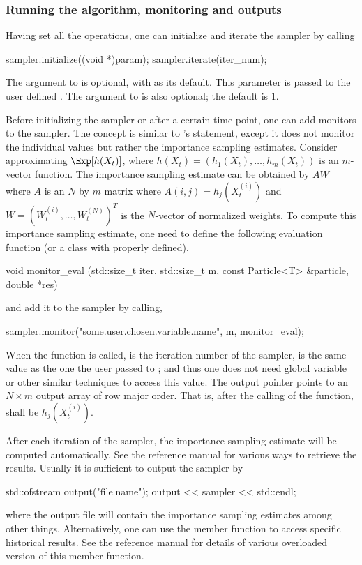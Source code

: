 \subsubsection{Running the algorithm, monitoring and outputs}

Having set all the operations, one can initialize and iterate the sampler by
calling
\begin{cppcode}
sampler.initialize((void *)param);
sampler.iterate(iter_num);
\end{cppcode}
The  argument to  is optional, with 
as its default. This parameter is passed to the user defined .
The  argument to  is also optional; the default
is $1$.

Before initializing the sampler or after a certain time point, one can add
monitors to the sampler. The concept is similar to \bugs's 
statement, except it does not monitor the individual values but rather the
importance sampling estimates. Consider approximating $\Exp[h(X_t)]$, where
$h(X_t) = (h_1(X_t),\dots,h_m(X_t))$ is an $m$-vector function. The importance
sampling estimate can be obtained by $AW$ where $A$ is an $N$ by $m$ matrix
where $A(i,j) = h_j(X_t^{(i)})$ and $W = (W_t^{(i)},\dots,W_t^{(N)})^T$ is the
$N$-vector of normalized weights. To compute this importance sampling
estimate, one need to define the following evaluation function (or a class
with  properly defined),
\begin{cppcode}
void monitor_eval (std::size_t iter, std::size_t m,
        const Particle<T> &particle, double *res)
\end{cppcode}
and add it to the sampler by calling,
\begin{cppcode}
sampler.monitor("some.user.chosen.variable.name", m, monitor_eval);
\end{cppcode}
When the function  is called,  is the iteration
number of the sampler,  is the same value as the one the user passed
to ; and thus one does not need global variable or
other similar techniques to access this value. The output pointer 
points to an $N \times m$ output array of row major order. That is, after the
calling of the function,  shall be $h_j(X_t^{(i)})$.

After each iteration of the sampler, the importance sampling estimate will be
computed automatically. See the reference manual for various ways to retrieve
the results. Usually it is sufficient to output the sampler by
\begin{cppcode}
std::ofstream output("file.name");
output << sampler << std::endl;
\end{cppcode}
where the output file will contain the importance sampling estimates among
other things. Alternatively, one can use the  member
function to access specific historical results. See the reference manual for
details of various overloaded version of this member function.

